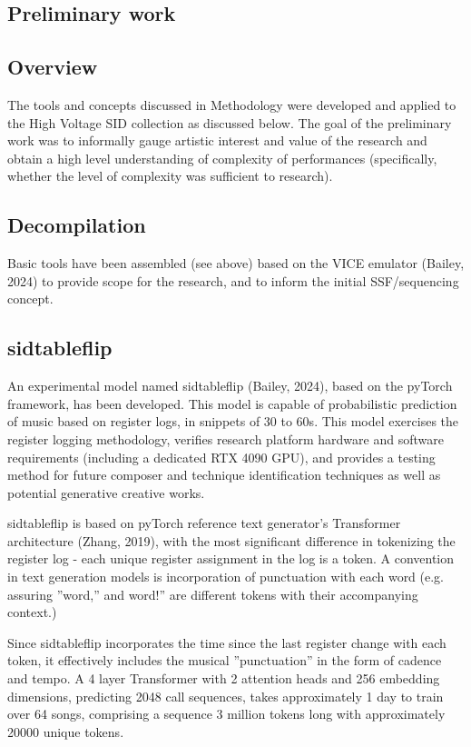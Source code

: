 \documentclass[10pt]{article}
\begin{document}
\begin{multicols*}{2}
  \section{Preliminary work}

\subsection{Overview}

The tools and concepts discussed in Methodology were developed and applied to the High Voltage SID collection as discussed below. The goal of the preliminary work was to informally gauge artistic interest and value of the research and obtain a high level understanding of complexity of performances (specifically, whether the level of complexity was sufficient to research).

\subsection{Decompilation}

Basic tools have been assembled (see above) based on the VICE emulator (Bailey, 2024) to provide scope for the research, and to inform the initial SSF/sequencing concept.

\subsection{sidtableflip}

An experimental model named sidtableflip (Bailey, 2024),  based on the pyTorch framework, has been developed. This model is capable of probabilistic prediction of music based on register logs, in snippets of 30 to 60s. This model exercises the register logging methodology, verifies research platform hardware and software requirements (including a dedicated RTX 4090 GPU), and provides a testing method for future composer and technique identification techniques as well as potential generative creative works.

sidtableflip is based on pyTorch reference text generator’s Transformer architecture (Zhang, 2019), with the most significant difference in tokenizing the register log - each unique register assignment in the log is a token. A convention in text generation models is incorporation of punctuation with each word (e.g. assuring ”word,” and word!” are different tokens with their accompanying context.)

Since sidtableflip incorporates the time since the last register change with each token,  it effectively includes the musical ”punctuation” in the form of cadence and tempo. A 4 layer Transformer with 2 attention heads and 256 embedding dimensions, predicting 2048 call sequences, takes approximately 1 day to train over 64 songs, comprising a sequence 3 million tokens long with approximately 20000 unique tokens.


\end{multicols*}
\end{document}
